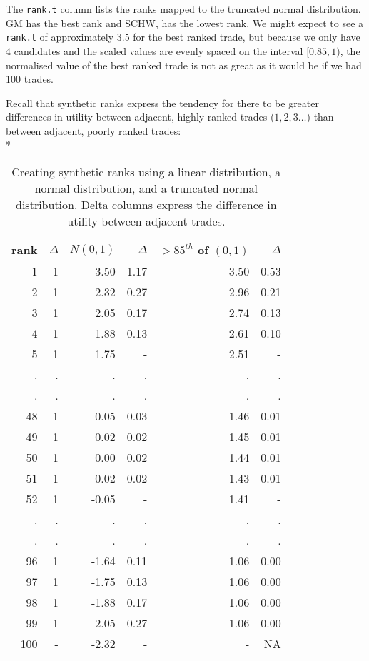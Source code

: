 \documentclass{article}
\begin{document}
The \texttt{rank.t} column lists the ranks mapped to the truncated
normal distribution.  GM has the best rank and
SCHW, has the lowest rank.  We might
expect to see a \texttt{rank.t} of approximately 3.5 for the best
ranked trade, but because we only have 4 candidates
and the scaled values are evenly spaced on the interval $[0.85,1)$,
the normalised value of the best ranked trade is not as great as
it would be if we had 100 trades.

Recall that synthetic ranks express the tendency for there to be
greater differences in utility between adjacent, highly ranked trades
($1,2,3\dots{}$) than between adjacent, poorly ranked trades: \\*

\begin{table}[!htbp]
  \begin{tabular}[c]{|rr|rr|rr|}
    \hline
    rank & $\Delta$ & $N(0,1)$ & $\Delta$ & $> 85^{th}$ of $(0,1)$ & $\Delta$ \\
      \hline
      1   & 1  &  3.50 & 1.17 & 3.50 & 0.53 \\
      2   & 1  &  2.32 & 0.27 & 2.96 & 0.21 \\
      3   & 1  &  2.05 & 0.17 & 2.74 & 0.13 \\
      4   & 1  &  1.88 & 0.13 & 2.61 & 0.10 \\
      5   & 1  &  1.75 & -    & 2.51 & -    \\
      .   & .  &     . &    . &    . &    . \\
      .   & .  &     . &    . &    . &    . \\
      48  & 1  &  0.05 & 0.03 & 1.46 & 0.01 \\
      49  & 1  &  0.02 & 0.02 & 1.45 & 0.01 \\
      50  & 1  &  0.00 & 0.02 & 1.44 & 0.01 \\
      51  & 1  & -0.02 & 0.02 & 1.43 & 0.01 \\
      52  & 1  & -0.05 & -    & 1.41 & -    \\
      .   & .  &     . &    . &    . &    . \\
      .   & .  &     . &    . &    . &    . \\
      96  & 1  & -1.64 & 0.11 & 1.06 & 0.00 \\
      97  & 1  & -1.75 & 0.13 & 1.06 & 0.00 \\
      98  & 1  & -1.88 & 0.17 & 1.06 & 0.00 \\
      99  & 1  & -2.05 & 0.27 & 1.06 & 0.00 \\
      100 & -  & -2.32 & -    & -    & NA   \\
      \hline
  \end{tabular}
  \caption[Synthetic rank distributions]{Creating synthetic ranks
    using a linear distribution, a normal distribution, and a
    truncated normal distribution.  Delta columns express the
    difference in utility between adjacent trades.\label{distribution
    table}}
\end{table}
\end{document}
